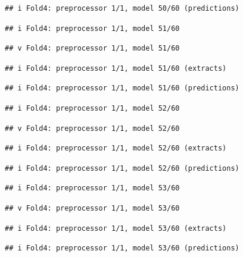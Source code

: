 \documentclass[
]{article}
\begin{document}
\begin{verbatim}
## i Fold4: preprocessor 1/1, model 50/60 (predictions)
\end{verbatim}

\begin{verbatim}
## i Fold4: preprocessor 1/1, model 51/60
\end{verbatim}

\begin{verbatim}
## v Fold4: preprocessor 1/1, model 51/60
\end{verbatim}

\begin{verbatim}
## i Fold4: preprocessor 1/1, model 51/60 (extracts)
\end{verbatim}

\begin{verbatim}
## i Fold4: preprocessor 1/1, model 51/60 (predictions)
\end{verbatim}

\begin{verbatim}
## i Fold4: preprocessor 1/1, model 52/60
\end{verbatim}

\begin{verbatim}
## v Fold4: preprocessor 1/1, model 52/60
\end{verbatim}

\begin{verbatim}
## i Fold4: preprocessor 1/1, model 52/60 (extracts)
\end{verbatim}

\begin{verbatim}
## i Fold4: preprocessor 1/1, model 52/60 (predictions)
\end{verbatim}

\begin{verbatim}
## i Fold4: preprocessor 1/1, model 53/60
\end{verbatim}

\begin{verbatim}
## v Fold4: preprocessor 1/1, model 53/60
\end{verbatim}

\begin{verbatim}
## i Fold4: preprocessor 1/1, model 53/60 (extracts)
\end{verbatim}

\begin{verbatim}
## i Fold4: preprocessor 1/1, model 53/60 (predictions)
\end{verbatim}
\end{document}
